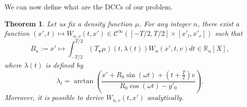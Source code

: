 \documentclass[a4paper]{article}
\numberwithin{equation}{section}
\newcommand{\RnX}{\mathbb{R}_n[X]}
\newcommand{\Cinf}{\mathcal{C}^{\infty}}
\newcommand{\Tbv}{T_{\mathbf{v}}}
\newtheorem{theorem}{Theorem}
\begin{document}
We can now define what are the DCCs of our problem.
\begin{theorem}
Let us fix a density function $\mu$. For any integer $n$, there exist a function $(x',t)\mapsto W_{n,v}(t,x') \in \Cinf \left( [-T/2,T/2] \times [x'_l,x'_r] \right)$ such that
\begin{equation}
	B_n := x' \mapsto \int_{-T/2}^{T/2} \left( \Tbv \mu \right)\left( t,\lambda(t) \right) W_n(x',t,v) dt \in \RnX,
\label{eq:DCC}
\end{equation}
where $\lambda(t)$ is defined by
\begin{equation}
	\lambda_t = \arctan \left( \frac{x' + R_0 \sin(\omega t) + \left( t + \frac{T}{2} \right)v}{R_0 \cos(\omega t) - y'_0} \right).
\end{equation}
Moreover, it is possible to derive $W_{n,v}(t,x')$ analytically.
\end{theorem}
\end{document}
